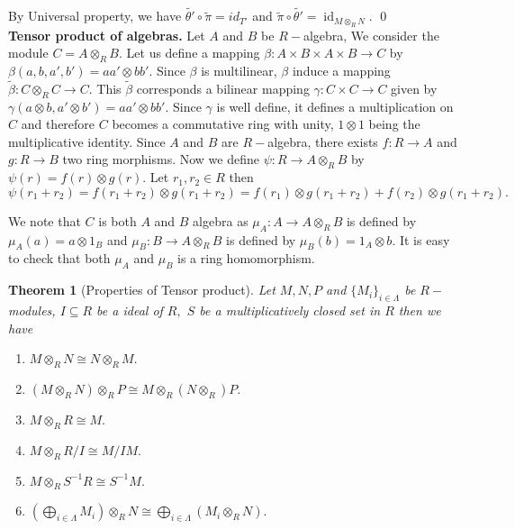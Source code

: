 \documentclass[11pt]{amsart}
\newtheorem{theorem}{Theorem}[section]
\DeclareMathOperator{\id}{\text{id}}
\begin{document}
\begin{center}
\end{center}

By Universal property, we have $\tilde{\theta'}\circ \tilde{\pi}=id_{T'}$ and $\tilde{\pi}\circ \tilde{\theta'}=\id_{M\otimes_R N}.$ \qed\\

\textbf{Tensor product of algebras.} Let $A$ and $B$ be $R-$algebra, We consider the module $C=A\otimes_R B$. Let us define a mapping $\beta:A\times B\times A\times B\to C$ by $\beta(a,b,a',b')=aa'\otimes bb'.$ Since $\beta$ is multilinear, $\beta$ induce a mapping $\tilde{\beta}:C\otimes_R C\to C$. This $\tilde{\beta}$ corresponds a bilinear mapping $\gamma:C\times C\to C$ given by $\gamma(a\otimes b,a'\otimes b')=aa'\otimes bb'.$ Since $\gamma$ is well define, it defines a multiplication on $C$ and therefore $C$ becomes a commutative ring with unity, $1\otimes 1$ being the multiplicative identity. Since $A$ and $B$ are $R-$algebra, there exists $f:R\to A$ and $g:R\to B$ two ring morphisms. Now we define $\psi:R\to A\otimes_R B$ by $\psi(r)=f(r)\otimes g(r).$ Let $r_1,r_2\in R$ then $\psi(r_1+r_2)=f(r_1+r_2)\otimes g(r_1+r_2)=f(r_1)\otimes g(r_1+r_2)+f(r_2)\otimes g(r_1+r_2).$



We note that $C$ is both $A$ and $B$ algebra as $\mu_A:A\to A\otimes_R B$ is defined by $\mu_A(a)=a\otimes 1_B$ and $\mu_B:B\to A\otimes_R B$ is defined by $\mu_B(b)=1_A\otimes b.$ It is easy to check that both $\mu_A$ and $\mu_B$ is a ring homomorphism.

\begin{theorem}[Properties of Tensor product]
Let $M,N,P$ and $\{M_i\}_{i\in\Lambda}$ be $R-$modules, $I\subseteq R$ be a ideal of $R,$ $S$ be a multiplicatively closed set in $R$ then we have
\begin{enumerate}
\item $M\otimes_R N\cong N\otimes_R M.$
\item $(M\otimes_R N)\otimes_R P\cong M\otimes_R(N\otimes_R) P.$
\item $M\otimes_R R\cong M.$
\item $M\otimes_R R/I \cong M/IM.$
\item $M\otimes_R S^{-1}R\cong S^{-1}M.$
\item $\left(\displaystyle\bigoplus_{i\in\Lambda} M_i\right) \otimes_R N\cong \displaystyle\bigoplus_{i\in\Lambda} (M_i\otimes_R N).$
\end{enumerate}
\end{theorem}
\end{document}
